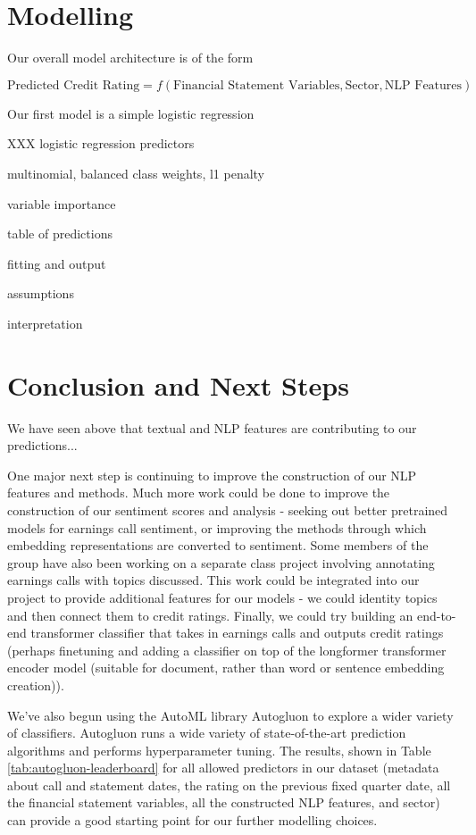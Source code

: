 \documentclass{article}[11pt]
\begin{document}
    \section*{Modelling}

    Our overall model architecture is of the form

    \begin{equation*}
        \text{Predicted Credit Rating} = f(\text{Financial Statement Variables}, \text{Sector}, \text{NLP Features})
    \end{equation*}

    Our first model is a simple logistic regression

    XXX logistic regression predictors

    multinomial, balanced class weights, l1 penalty

    variable importance

    table of predictions

    fitting and output

    assumptions
    
    interpretation

    \section*{Conclusion and Next Steps}

    We have seen above that textual and NLP features are contributing to our predictions...

    One major next step is continuing to improve the construction of our NLP features and methods. Much more work could be done to improve the construction of our sentiment scores and analysis - seeking out better pretrained models for earnings call sentiment, or improving the methods through which embedding representations are converted to sentiment. Some members of the group have also been working on a separate class project involving annotating earnings calls with topics discussed. This work could be integrated into our project to provide additional features for our models - we could identity topics and then connect them to credit ratings. Finally, we could try building an end-to-end transformer classifier that takes in earnings calls and outputs credit ratings (perhaps finetuning and adding a classifier on top of the longformer \citep{beltagy_longformer_2020} transformer encoder model (suitable for document, rather than word or sentence embedding creation)).

    We've also begun using the AutoML library Autogluon to explore a wider variety of classifiers. Autogluon runs a wide variety of state-of-the-art prediction algorithms and performs hyperparameter tuning. The results, shown in Table \ref{tab:autogluon-leaderboard} for all allowed predictors in our dataset (metadata about call and statement dates, the rating on the previous fixed quarter date, all the financial statement variables, all the constructed NLP features, and sector) can provide a good starting point for our further modelling choices.
\end{document}
